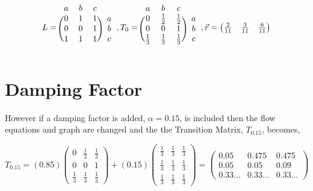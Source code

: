 \documentclass[12pt]{article}
\begin{document}
\[
L =
\begin{blockarray}{cccc}
a & b & c \\
\begin{block}{(ccc)c}
  0 & 1 & 1 & a \\
  0 & 0 & 1 & b \\
  1 & 1 & 1 & c \\
\end{block}
\end{blockarray}
%
,
%
T_0 = 
\begin{blockarray}{cccc}
a & b & c \\
\begin{block}{(ccc)c}
  0 & \frac{1}{2} & \frac{1}{2} & a \\
  0 & 0 & 1 & b \\
  \frac{1}{3} & \frac{1}{3} & \frac{1}{3} & c \\
\end{block}
\end{blockarray}
%
,
%
\vec{r} =
%
\begin{pmatrix}
   \frac{2}{11} & \frac{3}{11} & \frac{6}{11} \\
\end{pmatrix}
\]


%
%

\section{Damping Factor}

However if a damping factor is added, $\alpha = 0.15$, is included then the flow equations and graph are changed and the the Transition Matrix, $T_{0.15}$, becomes,

$$
T_{0.15} = 
\left( 0.85 \right)
\begin{pmatrix} 
  0 	& \frac{1}{2} 	& \frac{1}{2}  \\
  0 	& 0 			& 1 		 \\
  \frac{1}{3} 	& \frac{1}{3} 	& \frac{1}{3}
\end{pmatrix}
 + 
\left( 0.15 \right)
\begin{pmatrix} 
  \frac{1}{3} 	& \frac{1}{3} 	& \frac{1}{3} \\
  \frac{1}{3} 	& \frac{1}{3} 	& \frac{1}{3} \\
  \frac{1}{3} 	& \frac{1}{3} 	& \frac{1}{3}
\end{pmatrix}
=
\begin{pmatrix} 
  0.05 	& 0.475 	& 0.475 \\
  0.05 	& 0.05 	& 0.09 \\
  0.33 \dots 	&  0.33 \dots 	&  0.33 \dots
\end{pmatrix}
$$
\end{document}
